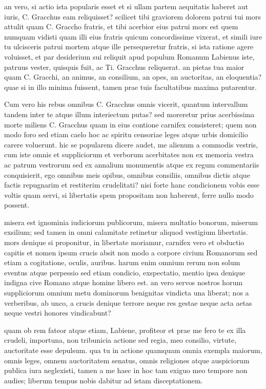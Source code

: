  an vero, si actio ista popularis esset et si ullam partem aequitatis haberet aut iuris, C. Gracchus eam reliquisset? scilicet tibi graviorem dolorem patrui tui mors attulit quam C. Graccho fratris, et tibi acerbior eius patrui mors est quem numquam vidisti quam illi eius fratris quicum concordissime vixerat, et simili iure tu ulcisceris patrui mortem atque ille persequeretur fratris, si ista ratione agere voluisset, et par desiderium sui reliquit apud populum Romanum Labienus iste, patruus vester, quisquis fuit, ac Ti. Gracchus reliquerat. an pietas tua maior quam C. Gracchi, an animus, an consilium, an opes, an auctoritas, an eloquentia? quae si in illo minima fuissent, tamen prae tuis facultatibus maxima putarentur.

 Cum vero his rebus omnibus C. Gracchus omnis vicerit, quantum intervallum tandem inter te atque illum interiectum putas? sed moreretur prius acerbissima morte miliens C. Gracchus quam in eius contione carnifex consisteret; quem non modo foro sed etiam caelo hoc ac spiritu censoriae leges atque urbis domicilio carere voluerunt. hic se popularem dicere audet, me alienum a commodis vestris, cum iste omnis et suppliciorum et verborum acerbitates non ex memoria vestra ac patrum vestrorum sed ex annalium monumentis atque ex regum commentariis conquisierit, ego omnibus meis opibus, omnibus consiliis, omnibus dictis atque factis repugnarim et restiterim crudelitati? nisi forte hanc condicionem vobis esse voltis quam servi, si libertatis spem propositam non haberent, ferre nullo modo possent.

 misera est ignominia iudiciorum publicorum, misera multatio bonorum, miserum exsilium; sed tamen in omni calamitate retinetur aliquod vestigium libertatis. mors denique si proponitur, in libertate moriamur, carnifex vero et obductio capitis et nomen ipsum crucis absit non modo a corpore civium Romanorum sed etiam a cogitatione, oculis, auribus. harum enim omnium rerum non solum eventus atque perpessio sed etiam condicio, exspectatio, mentio ipsa denique indigna cive Romano atque homine libero est. an vero servos nostros horum suppliciorum omnium metu dominorum benignitas vindicta una liberat; nos a verberibus, ab unco, a crucis denique terrore neque res gestae neque acta aetas neque vestri honores vindicabunt?

 quam ob rem fateor atque etiam, Labiene, profiteor et prae me fero te ex illa crudeli, importuna, non tribunicia actione sed regia, meo consilio, virtute, auctoritate esse depulsum. qua tu in actione quamquam omnia exempla maiorum, omnis leges, omnem auctoritatem senatus, omnis religiones atque auspiciorum publica iura neglexisti, tamen a me haec in hoc tam exiguo meo tempore non audies; liberum tempus nobis dabitur ad istam disceptationem.

